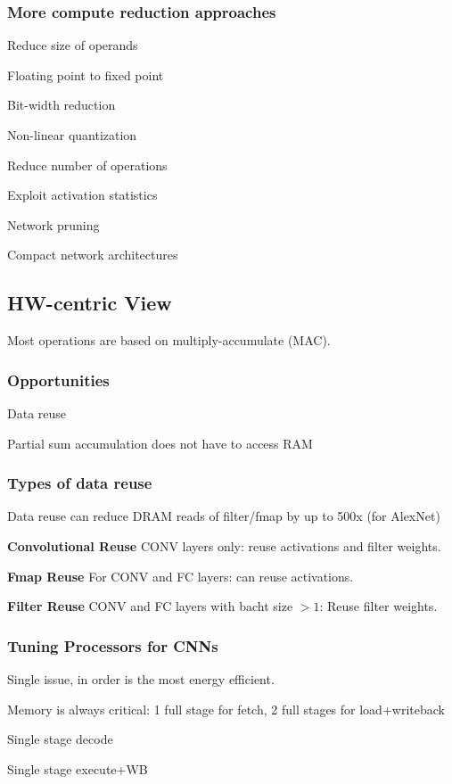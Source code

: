 \documentclass[a4paper, fontsize=8pt, landscape, DIV=1]{scrartcl}
\makeatletter
\renewenvironment{outline}[1][]{%
  \ifthenelse{\equal{#1}{}}{}{\renewcommand{\ol@type}{#1}}%
  \ol@z%
  \newcommand{\0}{\ol@toz\ol@z}%
  \newcommand{\1}{\vspace{\dimexpr\outlinespacingscalar\baselineskip-\baselineskip}\ol@toi\ol@i\item}%
  \newcommand{\2}{\vspace{\dimexpr\outlinespacingscalartwo\baselineskip-\baselineskip}\ol@toii\ol@ii\item}%
  \newcommand{\3}{\vspace{\dimexpr\outlinespacingscalar\baselineskip-\baselineskip}\ol@toiii\ol@iii\item}%
  \newcommand{\4}{\vspace{\dimexpr\outlinespacingscalar\baselineskip-\baselineskip}\ol@toiiii\ol@iiii\item}%
}{%
  \ol@toz\ol@exit%
}
\def\outlinespacingscalar{0.5}
\def\outlinespacingscalartwo{0.5}
\makeatother
\begin{document}
\begin{multicols*}{4}
  \subsubsection{More compute reduction approaches}
  \begin{outline}
    \1 Reduce size of operands
      \2 Floating point to fixed point
      \2 Bit-width reduction
      \2 Non-linear quantization
    \1 Reduce number of operations
      \2 Exploit activation statistics
      \2 Network pruning
      \2 Compact network architectures
  \end{outline}


  \subsection{HW-centric View}
  Most operations are based on multiply-accumulate (MAC).

  \subsubsection{Opportunities}
  \begin{outline}
    \1 Data reuse
    \1 Partial sum accumulation does not have to access RAM
  \end{outline}

  \subsubsection{Types of data reuse}
  Data reuse can reduce DRAM reads  of filter/fmap by up to 500x (for AlexNet)

  \textbf{Convolutional Reuse} CONV layers only: reuse activations and filter weights.

  \textbf{Fmap Reuse} For CONV and FC layers: can reuse activations.

  \textbf{Filter Reuse} CONV and FC layers with bacht size $> 1$: Reuse filter weights.

  \subsubsection{Tuning Processors for CNNs}
  Single issue, in order is the most energy efficient.
  \begin{outline}
    \1 Memory is always critical: 1 full stage for fetch, 2 full stages for load+writeback
    \1 Single stage decode
    \1 Single stage execute+WB
  \end{outline}


\end{multicols*}
\end{document}
